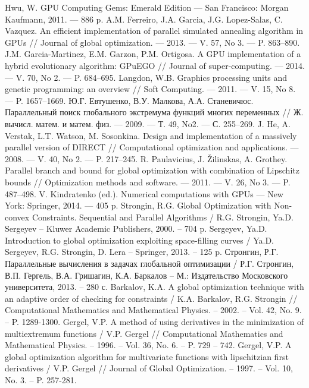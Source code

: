 \documentclass{svproc}
\begin{document}
%
%
\begin{thebibliography}{6}

	Hwu, W. GPU Computing Gems: Emerald Edition — San Francisco: Morgan Kaufmann, 2011. — 886 p.
	A.M. Ferreiro, J.A. Garcia, J.G. Lopez-Salas, C. Vazquez. An efficient implementation of parallel simulated annealing algorithm in GPUs // Journal of global optimization. — 2013. — V. 57, No 3. — P. 863–890.
	J.M. Garcia-Martinez, E.M. Garzon, P.M. Ortigosa. A GPU implementation of a hybrid evolutionary algorithm: GPuEGO // Journal of super-computing. — 2014. — V. 70, No 2. — P. 684–695.
	Langdon, W.B. Graphics processing units and genetic programming: an overview // Soft Computing. — 2011. — V. 15, No 8. — P. 1657–1669.
	Ю.Г. Евтушенко, В.У. Малкова, А.А. Станевичюс. Параллельный поиск глобального экстремума функций многих переменных // Ж. вычисл. матем. и матем. физ. — 2009. — Т. 49, No2. — С. 255–269.
	J. He, A. Verstak, L.T. Watson, M. Sosonkina. Design and implementation of a massively parallel version of DIRECT // Computational optimization and applications. — 2008. — V. 40, No 2. — P. 217–245.
	R. Paulavicius, J. Žilinskas, A. Grothey. Parallel branch and bound for global optimization with combination of Lipschitz bounds // Optimization methods and software. — 2011. — V. 26, No 3. — P. 487–498.
	V. Kindratenko (ed.). Numerical computations with GPUs — New York: Springer, 2014. — 405 p.
	Strongin, R.G. Global Optimization with Non-convex Constraints. Sequential and Parallel Algorithms / R.G. Strongin, Ya.D. Sergeyev – Kluwer Academic Publishers, 2000. – 704 p.
	Sergeyev, Ya.D. Introduction to global optimization exploiting space-filling curves / Ya.D. Sergeyev, R.G. Strongin, D. Lera – Springer, 2013. – 125 p.
	Стронгин, Р.Г. Параллельные вычисления в задачах глобальной оптимизации / Р.Г. Стронгин, В.П. Гергель, В.А. Гришагин, К.А. Баркалов – М.: Издательство Московского университета, 2013. – 280 с.
	Barkalov, K.A. A global optimization technique with an adaptive order of checking for constraints / K.A. Barkalov, R.G. Strongin // Computational Mathematics and Mathematical Physics. – 2002. – Vol. 42, No. 9. – P. 1289-1300.
	Gergel, V.P. A method of using derivatives in the minimization of multiextremum functions / V.P. Gergel // Computational Mathematics and Mathematical Physics. – 1996. – Vol. 36, No. 6. – P. 729 – 742.
	Gergel, V.P. A global optimization algorithm for multivariate functions with lipschitzian first derivatives / V.P. Gergel // Journal of Global Optimization. – 1997. – Vol. 10, No. 3. – P. 257-281.

\end{thebibliography}
\end{document}
